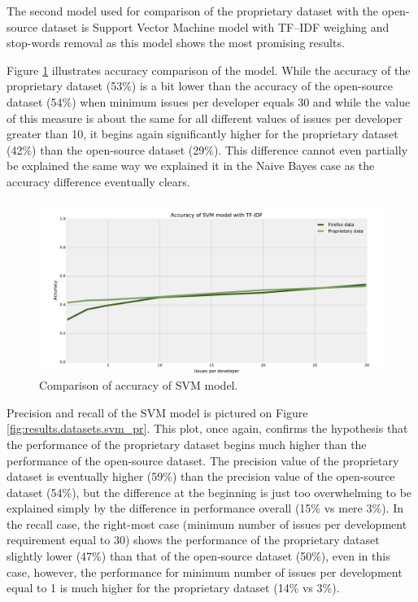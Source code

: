 The second model used for comparison of the proprietary dataset with the open-source dataset is Support Vector Machine model with TF--IDF weighing and stop-words removal as this model shows the most promising results.

Figure \ref{fig:results.datasets.svm_accuracy} illustrates accuracy comparison of the model. While the accuracy of the proprietary dataset (53\%) is a bit lower than the accuracy of the open-source dataset (54\%) when minimum issues per developer equals 30 and while the value of this measure is about the same for all different values of issues per developer greater than 10, it begins again significantly higher for the proprietary dataset (42\%) than the open-source dataset (29\%). This difference cannot even partially be explained the same way we explained it in the Naive Bayes case as the accuracy difference eventually clears.

\begin{figure}[htbp]
    \centering
        \includegraphics[width=\textwidth]{./images/prop_vs_os/svm_accuracy.pdf}
    \caption{Comparison of accuracy of SVM model.}
    \label{fig:results.datasets.svm_accuracy}
\end{figure}

Precision and recall of the SVM model is pictured on Figure \ref{fig:results.datasets.svm_pr}. This plot, once again, confirms the hypothesis that the performance of the proprietary dataset begins much higher than the performance of the open-source dataset. The precision value of the proprietary dataset is eventually higher (59\%) than the precision value of the open-source dataset (54\%), but the difference at the beginning is just too overwhelming to be explained simply by the difference in performance overall (15\% vs mere 3\%). In the recall case, the right-most case (minimum number of issues per development requirement equal to 30) shows the performance of the proprietary dataset slightly lower (47\%) than that of the open-source dataset (50\%), even in this case, however, the performance for minimum number of issues per development equal to 1 is much higher for the proprietary dataset (14\% vs 3\%).

